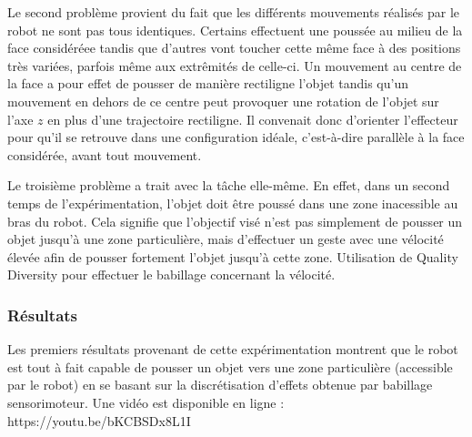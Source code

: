 \documentclass{llncs}
\begin{document}
Le second problème provient du fait que les différents mouvements réalisés par le robot ne sont pas tous identiques. Certains effectuent une poussée au milieu de la face considéréee tandis que d'autres vont toucher cette même face à des positions très variées, parfois même aux extrêmités de celle-ci. Un mouvement au centre de la face a pour effet de pousser de manière rectiligne l'objet tandis qu'un mouvement en dehors de ce centre peut provoquer une rotation de l'objet sur l'axe $z$ en plus d'une trajectoire rectiligne. Il convenait donc d'orienter l'effecteur pour qu'il se retrouve dans une configuration idéale, c'est-à-dire parallèle à la face considérée, avant tout mouvement.

Le troisième problème a trait avec la tâche elle-même. En effet, dans un second temps de l'expérimentation, l'objet doit être poussé dans une zone inacessible au bras du robot. Cela signifie que l'objectif visé n'est pas simplement de pousser  un objet jusqu'à une zone particulière, mais d'effectuer un geste avec une vélocité élevée afin de pousser fortement l'objet jusqu'à cette zone. Utilisation de Quality Diversity pour effectuer le babillage concernant la vélocité.

\subsubsection{Résultats}
Les premiers résultats provenant de cette expérimentation montrent que le robot est tout à fait capable de pousser un objet vers une zone particulière (accessible par le robot) en se basant sur la discrétisation d'effets obtenue par babillage sensorimoteur. Une vidéo est disponible en ligne : https://youtu.be/bKCBSDx8L1I




\end{document}
